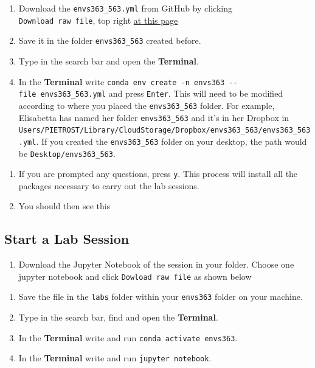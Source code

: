 \documentclass[
  letterpaper,
  DIV=11,
  numbers=noendperiod]{scrreprt}
\providecommand{\tightlist}{%
  \setlength{\itemsep}{0pt}\setlength{\parskip}{0pt}}\usepackage{longtable,booktabs,array}
\begin{document}
\begin{enumerate}
\def\labelenumi{\arabic{enumi}.}
\tightlist
\item
  Download the \texttt{envs363\_563.yml} from GitHub by clicking
  \texttt{Download\ raw\ file}, top right
  \href{https://github.com/pietrostefani/gds/blob/main/envs363-563.yml}{at
  this page}
\item
  Save it in the folder \texttt{envs363\_563} created before.
\item
  Type in the search bar and open the \textbf{Terminal}.
\item
  In the \textbf{Terminal} write
  \texttt{conda\ env\ create\ -n\ envs363\ -\/-file\ envs363\_563.yml}
  and press \texttt{Enter}. This will need to be modified according to
  where you placed the \texttt{envs363\_563} folder. For example,
  Elisabetta has named her folder \texttt{envs363\_563} and it's in her
  Dropbox in
  \texttt{Users/PIETROST/Library/CloudStorage/Dropbox/envs363\_563/envs363\_563.yml}.
  If you created the \texttt{envs363\_563} folder on your desktop, the
  path would be \texttt{Desktop/envs363\_563}.
\end{enumerate}

\begin{enumerate}
\def\labelenumi{\arabic{enumi}.}
\setcounter{enumi}{3}
\tightlist
\item
  If you are prompted any questions, press \texttt{y}. This process will
  install all the packages necessary to carry out the lab sessions.
\item
  You should then see this
\end{enumerate}

\subsection*{Start a Lab Session}\label{start-a-lab-session-1}

\begin{enumerate}
\def\labelenumi{\arabic{enumi}.}
\tightlist
\item
  Download the Jupyter Notebook of the session in your folder. Choose
  one jupyter notebook and click \texttt{Dowload\ raw\ file} as shown
  below
\end{enumerate}

\begin{enumerate}
\def\labelenumi{\arabic{enumi}.}
\setcounter{enumi}{1}
\tightlist
\item
  Save the file in the \texttt{labs} folder within your \texttt{envs363}
  folder on your machine.
\item
  Type in the search bar, find and open the \textbf{Terminal}.
\item
  In the \textbf{Terminal} write and run
  \texttt{conda\ activate\ envs363}.
\item
  In the \textbf{Terminal} write and run \texttt{jupyter\ notebook}.
\end{enumerate}
\end{document}
